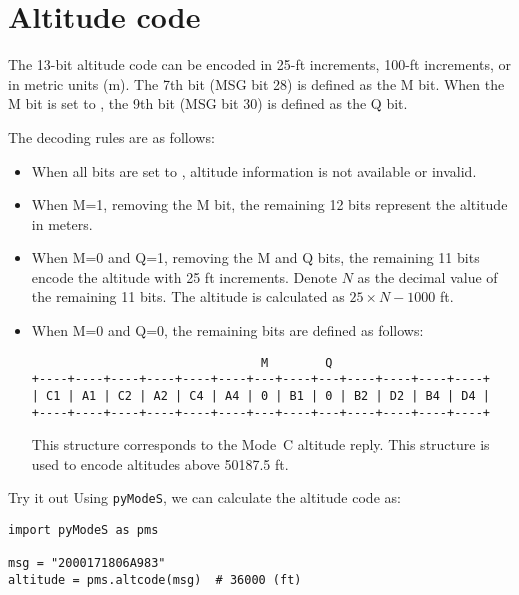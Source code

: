 


\section{Altitude code} \label{sec:alt_code}

The 13-bit altitude code can be encoded in 25-ft increments, 100-ft increments, or in metric units (m). The 7th bit (MSG bit 28) is defined as the M bit. When the M bit is set to \0, the 9th bit (MSG bit 30) is defined as the Q bit.

The decoding rules are as follows:

\begin{itemize}
  \item When all bits are set to \0, altitude information is not available or invalid.

  \item When M=1, removing the M bit, the remaining 12 bits represent the altitude in meters.

  \item When M=0 and Q=1, removing the M and Q bits, the remaining 11 bits encode the altitude with 25 ft increments. Denote $N$ as the decimal value of the remaining 11 bits. The altitude is calculated as $25 \times N - 1000$ ft.

  \item When M=0 and Q=0, the remaining bits are defined as follows:

\begin{verbatim}
                                M        Q
+----+----+----+----+----+----+---+----+---+----+----+----+----+
| C1 | A1 | C2 | A2 | C4 | A4 | 0 | B1 | 0 | B2 | D2 | B4 | D4 |
+----+----+----+----+----+----+---+----+---+----+----+----+----+
\end{verbatim}

  This structure corresponds to the Mode~C altitude reply. This structure is used to encode altitudes above 50187.5 ft.

\end{itemize}

\begin{notebox}{Try it out}
Using \texttt{pyModeS}, we can calculate the altitude code as: 

\begin{verbatim}
import pyModeS as pms

msg = "2000171806A983"
altitude = pms.altcode(msg)  # 36000 (ft)
\end{verbatim}

\end{notebox}



